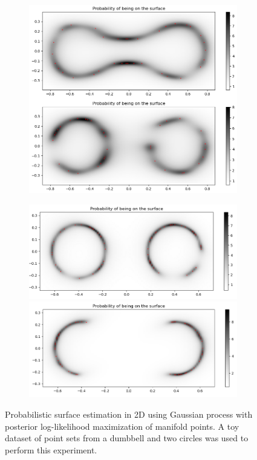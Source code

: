 \begin{figure}[htb]
\centering
\begin{subfigure}{0.45\textwidth}
    \vspace{-20pt}
    \includegraphics[width=\linewidth]{figures/gp2d/data_mapping_combined.png}
\end{subfigure}
\hfill
\begin{subfigure}{0.45\textwidth}
    \includegraphics[width=\linewidth]{figures/gp2d/augeye.png}
    \includegraphics[width=\linewidth]{figures/gp2d/augside.png}
\end{subfigure}
\hfill
\caption{Probabilistic surface estimation in 2D using Gaussian process with posterior log-likelihood maximization of manifold points. A toy dataset of point sets from a dumbbell and two circles was used to perform this experiment.}
\label{fig:2dgp}
\end{figure}


